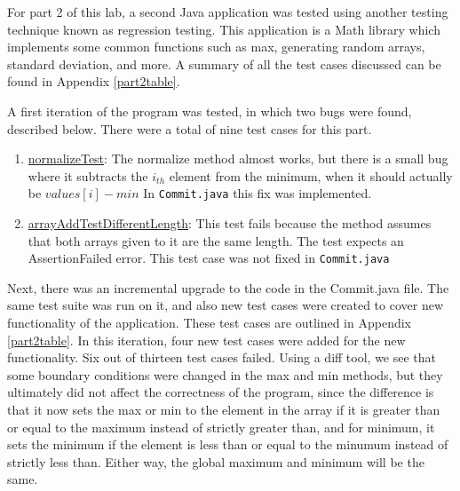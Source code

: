 For part 2 of this lab, a second Java application was tested using another
testing technique known as regression testing. This application is a Math
library which implements some common functions such as max, generating random
arrays, standard deviation, and more. A summary of all the test cases discussed
can be found in Appendix \ref{part2table}.

A first iteration of the program was tested, in which two bugs were found,
described below. There were a total of nine test cases for this part.

\begin{enumerate}
  \item \underline{normalizeTest}:
          The normalize method almost works, but there is a small bug where it
          subtracts the $i_{th}$ element from the minimum, when it should
          actually be $values[i] - min$
          In \texttt{Commit.java} this fix was implemented.
  \item \underline{arrayAddTestDifferentLength}:
          This test fails because the method assumes that both arrays given to
          it are the same length. The test expects an AssertionFailed error.
          This test case was not fixed in \texttt{Commit.java}
\end{enumerate}

Next, there was an incremental upgrade to the code in the Commit.java file.  The
same test suite was run on it, and also new test cases were created to cover new
functionality of the application. These test cases are outlined in Appendix
\ref{part2table}. In this iteration, four new test cases were added for the new
functionality. Six out of thirteen test cases failed.  Using a diff tool, we see
that some boundary conditions were changed in the max and min methods, but they
ultimately did not affect the correctness of the program, since the difference
is that it now sets the max or min to the element in the array if it is greater
than or equal to the maximum instead of strictly greater than, and for minimum,
it sets the minimum if the element is less than or equal to the minumum instead
of strictly less than. Either way, the global maximum and minimum will be the
same. 

